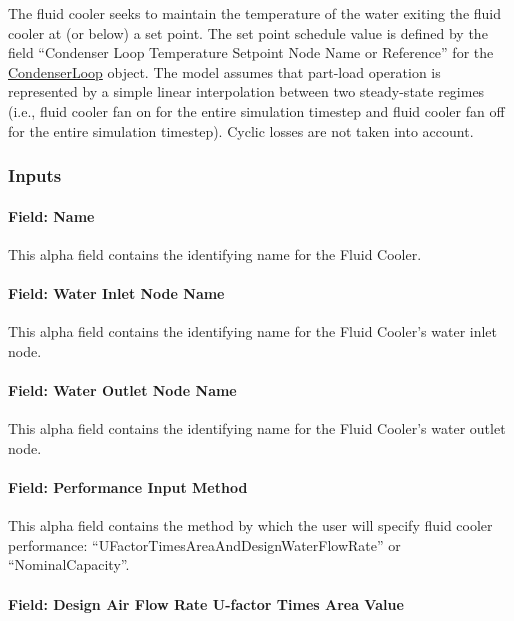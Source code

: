 The fluid cooler seeks to maintain the temperature of the water exiting the fluid cooler at (or below) a set point. The set point schedule value is defined by the field ``Condenser Loop Temperature Setpoint Node Name or Reference'' for the \hyperref[condenserloop]{CondenserLoop} object. The model assumes that part-load operation is represented by a simple linear interpolation between two steady-state regimes (i.e., fluid cooler fan on for the entire simulation timestep and fluid cooler fan off for the entire simulation timestep). Cyclic losses are not taken into account.

\subsubsection{Inputs}\label{inputs-8-003}

\paragraph{Field: Name}\label{field-name-7-003}

This alpha field contains the identifying name for the Fluid Cooler.

\paragraph{Field: Water Inlet Node Name}\label{field-water-inlet-node-name-5}

This alpha field contains the identifying name for the Fluid Cooler's water inlet node.

\paragraph{Field: Water Outlet Node Name}\label{field-water-outlet-node-name-6}

This alpha field contains the identifying name for the Fluid Cooler's water outlet node.

\paragraph{Field: Performance Input Method}\label{field-performance-input-method-5}

This alpha field contains the method by which the user will specify fluid cooler performance: ``UFactorTimesAreaAndDesignWaterFlowRate'' or ``NominalCapacity''.

\paragraph{Field: Design Air Flow Rate U-factor Times Area Value}\label{field-design-air-flow-rate-u-factor-times-area-value-2}

